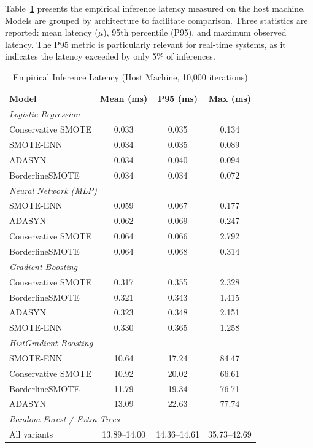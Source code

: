 Table~\ref{tab:empirical_latency} presents the empirical inference latency measured on the host machine. Models are grouped by architecture to facilitate comparison. Three statistics are reported: mean latency ($\mu$), 95th percentile (P95), and maximum observed latency. The P95 metric is particularly relevant for real-time systems, as it indicates the latency exceeded by only 5\% of inferences.

\begin{table}[htbp]
\centering
\caption{Empirical Inference Latency (Host Machine, 10,000 iterations)}
\label{tab:empirical_latency}
\begin{tabular}{lccc}
\hline
\textbf{Model} & \textbf{Mean (ms)} & \textbf{P95 (ms)} & \textbf{Max (ms)} \\
\hline
\multicolumn{4}{l}{\textit{Logistic Regression}} \\
\quad Conservative SMOTE & 0.033 & 0.035 & 0.134 \\
\quad SMOTE-ENN & 0.034 & 0.035 & 0.089 \\
\quad ADASYN & 0.034 & 0.040 & 0.094 \\
\quad BorderlineSMOTE & 0.034 & 0.034 & 0.072 \\
\hline
\multicolumn{4}{l}{\textit{Neural Network (MLP)}} \\
\quad SMOTE-ENN & 0.059 & 0.067 & 0.177 \\
\quad ADASYN & 0.062 & 0.069 & 0.247 \\
\quad Conservative SMOTE & 0.064 & 0.066 & 2.792 \\
\quad BorderlineSMOTE & 0.064 & 0.068 & 0.314 \\
\hline
\multicolumn{4}{l}{\textit{Gradient Boosting}} \\
\quad Conservative SMOTE & 0.317 & 0.355 & 2.328 \\
\quad BorderlineSMOTE & 0.321 & 0.343 & 1.415 \\
\quad ADASYN & 0.323 & 0.348 & 2.151 \\
\quad SMOTE-ENN & 0.330 & 0.365 & 1.258 \\
\hline
\multicolumn{4}{l}{\textit{HistGradient Boosting}} \\
\quad SMOTE-ENN & 10.64 & 17.24 & 84.47 \\
\quad Conservative SMOTE & 10.92 & 20.02 & 66.61 \\
\quad BorderlineSMOTE & 11.79 & 19.34 & 76.71 \\
\quad ADASYN & 13.09 & 22.63 & 77.74 \\
\hline
\multicolumn{4}{l}{\textit{Random Forest / Extra Trees}} \\
\quad All variants & 13.89--14.00 & 14.36--14.61 & 35.73--42.69 \\
\hline
\end{tabular}
\end{table}

